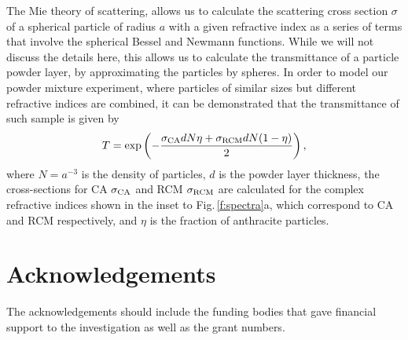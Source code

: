\documentclass[smallextended]{svjour3}
\begin{document}
The Mie theory of scattering, allows us to calculate the scattering cross section $\sigma$ of a spherical particle of radius $a$ with a given refractive index as a series of terms that involve the spherical Bessel and Newmann functions. While we will not discuss the details here, this allows us to calculate the transmittance of a particle powder layer, by approximating the particles by spheres. In order to model our powder mixture experiment, where particles of similar sizes but different refractive indices are combined, it can be demonstrated that the transmittance of such sample is given by
\begin{equation}
	T=\exp\left(-\frac{\sigma_{\rm CA} d N \eta + \sigma_{\rm RCM} d N (1-\eta)}{ 2}\right), %
\end{equation}
where $N=a^{-3}$ is the density of particles, $d$ is the powder layer thickness, the cross-sections for CA $\sigma_{\rm CA}$ and RCM $\sigma_{\rm RCM}$ are calculated for the complex refractive indices shown in the inset to Fig.\,\ref{f:spectra}a, which correspond to CA and RCM respectively, and $\eta$ is the fraction of anthracite particles. 

\section*{Acknowledgements}
The acknowledgements should include the funding bodies that gave financial support to the investigation as well as the grant numbers.





\end{document}
